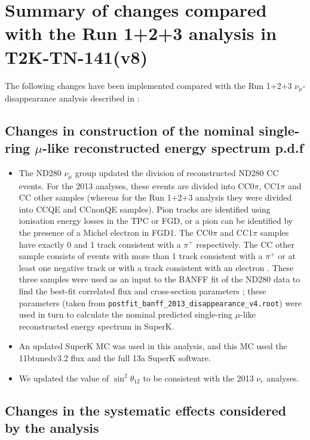 \clearpage

\section {Summary of changes compared with the Run 1+2+3 analysis in T2K-TN-141(v8) }
\label{sec:changes}

The following changes have been implemented compared with the Run 1+2+3 $\nu_{\mu}$-disappearance
analysis described in \cite{OurRun123DisappAnalysis3Flavour} :

\subsection{Changes in construction of the nominal single-ring $\mu$-like reconstructed energy spectrum p.d.f}

\begin{itemize}
\item The ND280 $\nu_{\mu}$ group updated the division of reconstructed ND280 CC events. For the 2013 analyses, these events 
are divided into CC0$\pi$, CC1$\pi$ and CC other samples (whereas for the Run 1+2+3 analysis they were divided into CCQE and 
CCnonQE samples). Pion tracks are identified using ionisation energy losses in the TPC or FGD, or a pion can be identified 
by the presence of a Michel electron in FGD1. The CC0$\pi$ and CC1$\pi$ samples have exactly 0 and 1 track consistent with 
a $\pi^{+}$ respectively. The CC other sample consists of events with more than 1 track consistent with a $\pi^{+}$ or at least 
one negative track or with a track consistent with an electron \cite{ND280Inputs}. These three samples were used as an input to 
the BANFF fit of the ND280 data to find the best-fit correlated flux
and cross-section parameters \cite{BANFF2013}; these parameters (taken from \verb+postfit_banff_2013_disappearance_v4.root+) were used in 
turn to calculate the nominal predicted single-ring $\mu$-like reconstructed energy spectrum in SuperK.
\item An updated SuperK MC was used in this analysis, and this MC used the 11btunedv3.2 flux and the full 13a SuperK software.
\item We updated the value of $\sin^2\theta_{12}$ to be consistent
  with the 2013 $\nu_e$ analyses.
\end{itemize}

\subsection{Changes in the systematic effects considered by the analysis}

